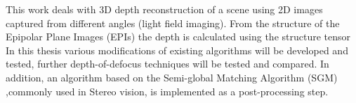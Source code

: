 This work deals with 3D depth reconstruction of a scene using 2D images captured from different angles (light field imaging). From the structure of the Epipolar Plane Images (EPIs) the depth is calculated using the structure tensor In this thesis various modifications of existing algorithms will be developed and tested, further depth-of-defocus techniques will be tested and compared. In addition, an algorithm based on the Semi-global Matching Algorithm (SGM) ,commonly used in Stereo vision, is implemented as a post-processing step.